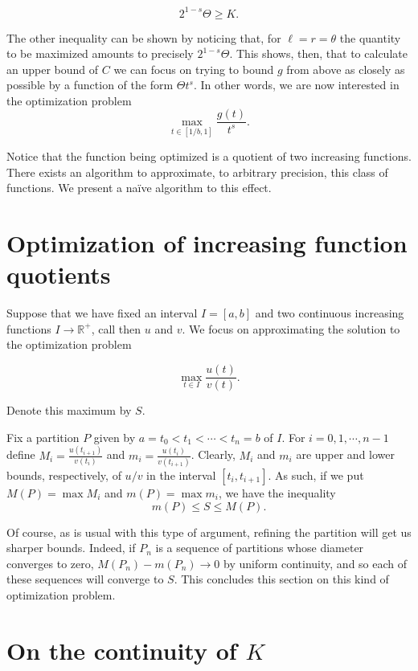 \documentclass[11pt, reqno]{amsart}
\newcommand{\R}{\mathbb{R}}
\begin{document}
\[ 2^{1-s} \Theta \geq K.\]

The other inequality can be shown by noticing that, for $\ell = r = \theta$ the quantity to be maximized amounts to precisely $2^{1-s} \Theta$. This shows, then, that to calculate an upper bound of $C$ we can focus on trying to bound $g$ from above as closely as possible by a function of the form $\Theta t^s$. In other words, we are now interested in the optimization problem
\[ \max_{t \in \left[ 1/b, 1 \right]} \frac{g(t)}{t^s}.\]

Notice that the function being optimized is a quotient of two increasing functions. There exists an algorithm to approximate, to arbitrary precision, this class of functions. We present a naïve algorithm to this effect.

\section{Optimization of increasing function quotients} \label{optimization}

Suppose that we have fixed an interval $I = \left[ a, b \right]$ and two continuous increasing functions $I \to \R^+$, call then $u$ and $v$. We focus on approximating the solution to the optimization problem

\[ \max_{t \in I} \frac{u(t)}{v(t)}.\]

Denote this maximum by $S$.

Fix a partition $P$ given by $a = t_0 < t_1 < \cdots < t_n = b$ of $I$. For $i = 0, 1, \cdots, n-1$ define $M_i = \frac{u(t_{i+1})}{v(t_i)}$ and $m_i = \frac{u(t_i)}{v(t_{i+1})}$. Clearly, $M_i$ and $m_i$ are upper and lower bounds, respectively, of $u/v$ in the interval $\left[t_i, t_{i+1} \right]$. As such, if we put $M(P) = \max M_i$ and $m(P) = \max m_i$, we have the inequality
\[m(P) \leq S \leq M(P).\]

Of course, as is usual with this type of argument, refining the partition will get us sharper bounds. Indeed, if $P_n$ is a sequence of partitions whose diameter converges to zero, $M(P_n) - m(P_n) \to 0$ by uniform continuity, and so each of these sequences will converge to $S$. This concludes this section on this kind of optimization problem.

\section{On the continuity of $K$}
\end{document}

